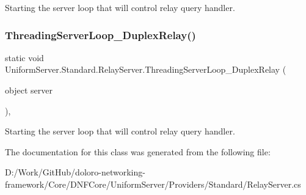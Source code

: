 Starting the server loop that will control relay query handler. 

\mbox{\label{class_uniform_server_1_1_standard_1_1_relay_server_a8612def1490dc0c8e0b4535a54a09c18}} 
\subsubsection{\texorpdfstring{Threading\+Server\+Loop\+\_\+\+Duplex\+Relay()}{ThreadingServerLoop\_DuplexRelay()}}
{\footnotesize\ttfamily static void Uniform\+Server.\+Standard.\+Relay\+Server.\+Threading\+Server\+Loop\+\_\+\+Duplex\+Relay (\begin{DoxyParamCaption}\item[{object}]{server }\end{DoxyParamCaption})\hspace{0.3cm}{\ttfamily [static]}, {\ttfamily [protected]}}



Starting the server loop that will control relay query handler. 



The documentation for this class was generated from the following file\+:\begin{DoxyCompactItemize}
\item 
D\+:/\+Work/\+Git\+Hub/doloro-\/networking-\/framework/\+Core/\+D\+N\+F\+Core/\+Uniform\+Server/\+Providers/\+Standard/Relay\+Server.\+cs\end{DoxyCompactItemize}

